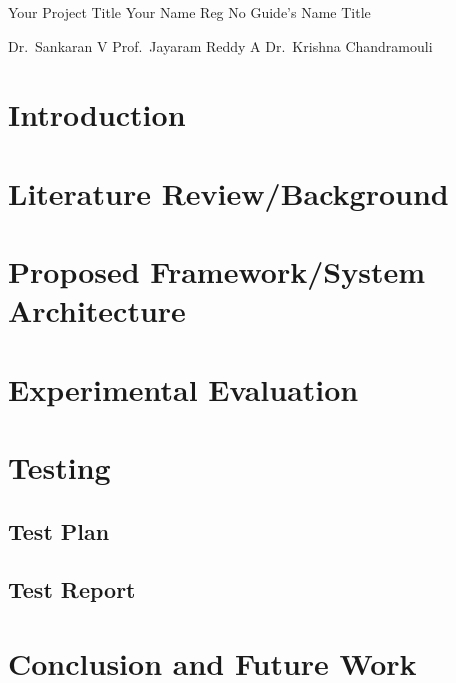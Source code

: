 \documentclass{vitmsprojectreport}
\begin{document}

\maketitlepage%
{Your Project Title}%
{Your Name}%
{Reg No}%
{Guide's Name}%
{Title}%

\makedeclarationpage

\makebonafidepage

\makeackpage%
{Dr.~Sankaran V}%
{Prof.~Jayaram Reddy A}%
{Dr.~Krishna Chandramouli}%


\tableofcontents  %
\listoffigures    %
\listoftables     %

\setcounter{page}{1}


\chapter{Introduction}

\chapter{Literature Review/Background}

\chapter{Proposed Framework/System Architecture}

\chapter{Experimental Evaluation}

\chapter{Testing}

\section{Test Plan}

\section{Test Report}

\chapter{Conclusion and Future Work}

\end{document}
